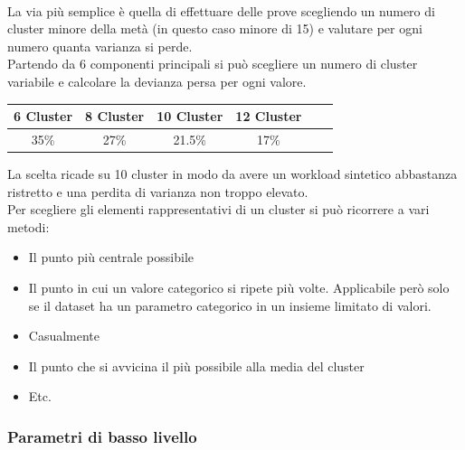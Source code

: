 \\La via più semplice è quella di effettuare delle prove scegliendo un numero di cluster minore della metà (in questo caso minore di 15) e valutare per ogni numero quanta varianza si perde.
\\Partendo da 6 componenti principali si può scegliere un numero di cluster variabile e calcolare la devianza persa per ogni valore.
\begin{center}
	\begin{tabular}{|c|c|c|c|c|c|}
		\hline
		\textbf{6 Cluster} & \textbf{8 Cluster} & \textbf{10 Cluster} &\textbf{12 Cluster} \\
		\hline
		35\% & 27\%& 21.5\% & 17\% \\
		\hline
	\end{tabular}
\end{center}
La scelta ricade su 10 cluster in modo da avere un workload sintetico abbastanza ristretto e una perdita di varianza non troppo elevato.
\\Per scegliere gli elementi rappresentativi di un cluster si può ricorrere a vari metodi:
\begin{itemize}
	\item Il punto più centrale possibile
	\item Il punto in cui un valore categorico si ripete più volte. Applicabile però solo se il dataset ha un parametro categorico in un insieme limitato di valori.
	\item Casualmente
	\item Il punto che si avvicina il più possibile alla media del cluster
	\item Etc.
\end{itemize}



\subsubsection{Parametri di basso livello}


